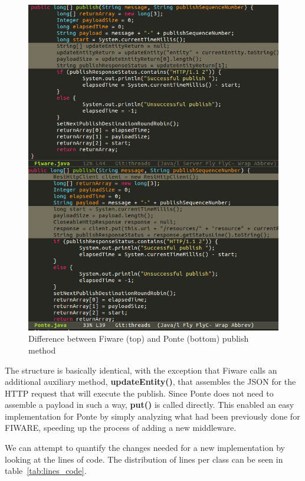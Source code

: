 \documentclass[conference]{IEEEtran}
\begin{document}
\begin{figure}[htbp!]
  \centering
  \includegraphics[width=\columnwidth]{figures/fiware_ponte_diff.png}
  \caption{Difference between Fiware (top) and Ponte (bottom) publish method}
  \label{fig:fiware_ponte_diff}
\end{figure}

The structure is basically identical, with the exception that Fiware calls an additional auxiliary method, \textbf{updateEntity()}, that assembles the JSON for the HTTP request that will execute the publish. Since Ponte does not need to assemble a payload in such a way, \textbf{put()} is called directly. This enabled an easy implementation for Ponte by simply analyzing what had been previously done for FIWARE, speeding up the process of adding a new middleware.

We can attempt to quantify the changes needed for a new implementation by looking at the lines of code. The distribution of lines per class can be seen in table~\ref{tab:lines_code}.
\end{document}
